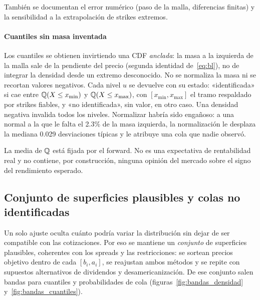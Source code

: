 También se documentan el error numérico (paso de la malla, diferencias finitas) y la sensibilidad a la
extrapolación de strikes extremos.

\paragraph{Cuantiles sin masa inventada} Los cuantiles se obtienen invirtiendo una CDF \emph{anclada}: la
masa a la izquierda de la malla sale de la pendiente del precio (segunda identidad de~\eqref{eq:bl}), no
de integrar la densidad desde un extremo desconocido. No se normaliza la masa ni se recortan valores
negativos. Cada nivel $u$ se devuelve con su estado: «identificada» si cae entre $\mathbb{Q}(X\le x_{\min})$ y
$\mathbb{Q}(X\le x_{\max})$, con $[x_{\min},x_{\max}]$ el tramo respaldado por strikes fiables, y «no
identificada», sin valor, en otro caso. Una densidad negativa invalida todos los niveles. Normalizar
habría sido engañoso: a una normal a la que le falta el 2.3\% de la masa izquierda, la normalización le
desplaza la mediana 0.029 desviaciones típicas y le atribuye una cola que nadie observó.

\begin{noconcluir}
La media de $\mathbb{Q}$ está fijada por el forward. No es una expectativa de rentabilidad real y no contiene, por
construcción, ninguna opinión del mercado sobre el signo del rendimiento esperado.
\end{noconcluir}

\subsection{Conjunto de superficies plausibles y colas no identificadas}\label{sec:bandas}

Un solo ajuste oculta cuánto podría variar la distribución sin dejar de ser compatible con las
cotizaciones. Por eso se mantiene un \emph{conjunto} de superficies plausibles, coherentes con los spreads
y las restricciones: se sortean precios objetivo dentro de cada $[b_i,a_i]$, se reajustan ambos métodos y
se repite con supuestos alternativos de dividendos y desamericanización. De ese conjunto salen bandas para
cuantiles y probabilidades de cola (figuras~\ref{fig:bandas_densidad} y~\ref{fig:bandas_cuantiles}).


